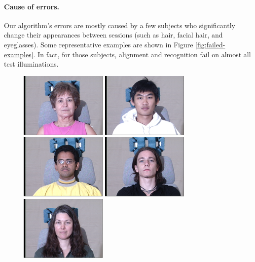\paragraph{Cause of errors.} Our algorithm's errors are mostly caused by a few subjects who significantly change their appearances between sessions (such as hair, facial hair, and eyeglasses). Some representative examples are shown in Figure \ref{fig:failed-examples}. In fact, for those subjects, alignment and recognition fail on almost all test illuminations.\vspace{0mm} %
\begin{figure}
\centering
\includegraphics[scale=0.4,clip=true]{figures_cvpr/079_01_01_051_08.png} 
\includegraphics[scale=0.4,clip=true]{figures_cvpr/130_01_01_051_08.png} 
\includegraphics[scale=0.4,clip=true]{figures_cvpr/163_01_01_051_08.png} 
\includegraphics[scale=0.4,clip=true]{figures_cvpr/175_01_01_051_08.png} 
\includegraphics[scale=0.4,clip=true]{figures_cvpr/118_01_01_051_08.png} 

\end{figure}
